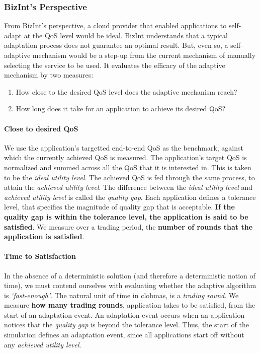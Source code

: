 \documentclass[10pt,journal,compsoc]{IEEEtran}
\begin{document}
\subsubsection{BizInt's Perspective}
From BizInt's perspective, a cloud provider that enabled applications to self-adapt at the QoS level would be ideal. BizInt understands that a typical adaptation process does not guarantee an optimal result. But, even so, a self-adaptive mechanism would be a step-up from the current mechanism of manually selecting the service to be used. It evaluates the efficacy of the adaptive mechanism by two measures:
	\begin{enumerate}
		\item How close to the desired QoS level does the adaptive mechanism reach?
		\item How long does it take for an application to achieve its desired QoS?
	\end{enumerate}
\paragraph{Close to desired QoS}  We use the application's targetted end-to-end QoS as the benchmark, against which the currently achieved QoS is measured. The application's target QoS is normalized and summed across all the QoS that it is interested in. This is taken to be the \textit{ideal utility level}. The achieved QoS is fed through the same process, to attain the \textit{achieved utility level}. The difference between the \textit{ideal utility level} and \textit{achieved utility level} is called the \textit{quality gap}. Each application defines a tolerance level, that specifies the magnitude of quality gap that is acceptable. \textbf{If the quality gap is within the tolerance level, the application is said to be satisfied}. We measure over a trading period, the \textbf{number of rounds that the application is satisfied}.

\paragraph{Time to Satisfaction} In the absence of a deterministic solution (and therefore a deterministic notion of time), we must contend ourselves with evaluating whether the adaptive algorithm is \textit{`fast-enough'}.  The natural unit of time in clobmas, is a \textit{trading round}.  We measure \textbf{how many trading rounds}, application takes to be satisfied, from the start of an adaptation event. An adaptation event occurs when an application notices that the \textit{quality gap} is beyond the tolerance level. Thus, the start of the simulation defines an adaptation event, since all applications start off without any \textit{achieved utility level}.
	
\end{document}
